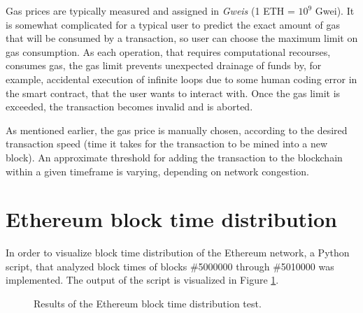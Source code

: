 Gas prices are typically measured and assigned in \emph{\Glspl{Gwei}} (1 ETH = $10^9$ Gwei). It is somewhat complicated for a typical user to predict the exact amount of gas that will be consumed by a transaction, so user can choose the maximum limit on gas consumption. As each operation, that requires computational recourses, consumes gas, the gas limit prevents unexpected drainage of funds by, for example, accidental execution of infinite loops due to some human coding error in the smart contract, that the user wants to interact with. Once the gas limit is exceeded, the transaction becomes invalid and is aborted. 

As mentioned earlier, the gas price is manually chosen, according to the desired transaction speed (time it takes for the transaction to be mined into a new block). An approximate threshold for adding the transaction to the blockchain within a given timeframe is varying, depending on network congestion.

\pagebreak

\section{Ethereum block time distribution} \label{section:blocktimes}

In order to visualize block time distribution of the Ethereum network, a Python script, that analyzed block times of blocks \#5000000 through \#5010000 was implemented. The output of the script is visualized in Figure \ref{fig:ethtimetest}.

\begin{figure}[H]
\centering
{}
\caption{Results of the Ethereum block time distribution test.}
\label{fig:ethtimetest}
\end{figure}

